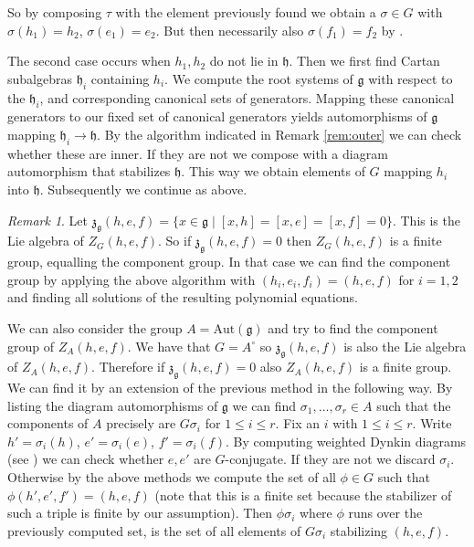 \documentclass[a4paper,10pt]{amsart}
\newcommand{\mf}{\mathfrak}
\newcommand{\g}{\mf{g}}
\newcommand{\h}{\mf{h}}
\newcommand{\z}{\mf{z}}
\newcommand{\Aut}{\mathrm{Aut}}
\numberwithin{equation}{section}
\theoremstyle{remark}
\theoremstyle{remark}
\newtheorem{rmk}[theorem]{Remark}
\begin{document}
So by composing $\tau$ with the element previously found we obtain
a $\sigma\in G$ with $\sigma(h_1)=h_2$, $\sigma(e_1)=e_2$. But then
necessarily also $\sigma(f_1)=f_2$ by \cite[Lemma 8.1.1]{gra16}.

The second case occurs when $h_1,h_2$ do not lie in $\h$. Then we first find
Cartan subalgebras
$\h_i$ containing $h_i$. We compute the root systems of $\g$ with respect to
the $\h_i$, and corresponding canonical sets of generators. Mapping these
canonical generators to our fixed set of canonical generators yields
automorphisms of $\g$ mapping $\h_i\to \h$. By the algorithm indicated in
Remark \ref{rem:outer} we can check whether these are inner. If they
are not we compose with a diagram automorphism that stabilizes $\h$.
This way we obtain elements of $G$ mapping $h_i$ into $\h$. Subsequently
we continue as above.

\begin{rmk}\label{rem:0-dim}
Let $\z_\g(h,e,f) = \{x\in \g\mid [x,h]=[x,e]=[x,f]=0\}$. This is the Lie
algebra of $Z_G(h,e,f)$. So if $\z_\g(h,e,f)=0$ then $Z_G(h,e,f)$ is a finite
group, equalling the component group. In that case we can find the component
group by applying the above algorithm with $(h_i,e_i,f_i) = (h,e,f)$ for
$i=1,2$ and finding all solutions of the resulting polynomial equations.

We can also consider the group $A=\Aut(\g)$ and try to find the component
group of $Z_A(h,e,f)$. We have that $G=A^\circ$ so  $\z_\g(h,e,f)$ is also
the Lie algebra of $Z_A(h,e,f)$. Therefore if  $\z_\g(h,e,f)=0$ also
$Z_A(h,e,f)$ is a finite group. We can find it by an extension of the previous
method in the following way. By listing the diagram automorphisms of
$\g$ we can find $\sigma_1,\ldots,\sigma_r\in A$ such that the components
of $A$ precisely are $G\sigma_i$ for $1\leq i\leq r$. Fix an $i$ with
$1\leq i\leq r$. Write $h'=\sigma_i(h)$, $e'=\sigma_i(e)$, $f'=\sigma_i(f)$.
By computing weighted Dynkin diagrams (see \cite[\S 8.2]{gra16})
we can check whether $e,e'$ are $G$-conjugate. If they are not we discard
$\sigma_i$. Otherwise by the above methods we compute the set of all $\phi\in
G$ such that $\phi (h',e',f')=(h,e,f)$ (note that this is a finite set
because the stabilizer of such a triple is finite by our assumption). Then
$\phi\sigma_i$ where $\phi$ runs over the previously computed set, is the
set of all elements of $G\sigma_i$ stabilizing $(h,e,f)$. 
\end{rmk}
\end{document}
